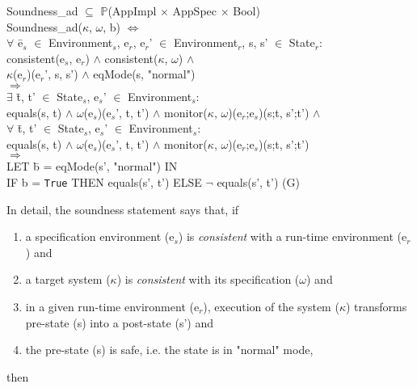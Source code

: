 \documentclass[conference]{IEEEtran}
\begin{document}
\begin{tabbing}
Soundness\_ad $\subseteq$ $\mathbb{P}$(AppImpl $\times$ AppSpec $\times$ Bool)
\\Soundness\_ad($\kappa$, $\omega$, b) $\Leftrightarrow$
\\$\forall$ \=e$_s$ $\in$ Environment$_s$, e$_r$, e$_r$' $\in$ Environment$_r$, s, s' $\in$ State$_r$:
\\\>consistent(e$_s$, e$_r$) $\wedge$ consistent($\kappa$, $\omega$) $\wedge$ 
\\\>\textlbrackdbl $\kappa$\textrbrackdbl(e$_r$)(e$_r$', s, s') $\wedge$ eqMode(s, "normal")
\\$\Rightarrow$
\\\>$\exists$ \=t, t' $\in$ State$_s$, e$_s$' $\in$ Environment$_s$: 
\\\>\>equals(s, t) $\wedge$ \textlbrackdbl $\omega$\textrbrackdbl(e$_s$)(e$_s$', t, t') $\wedge$ monitor($\kappa$, $\omega$)(e$_r$;e$_s$)(s;t, s';t')
$\wedge$
\\\>$\forall$ \=t, t' $\in$ State$_s$, e$_s$' $\in$ Environment$_s$: 
\\\>\>equals(s, t) $\wedge$ \textlbrackdbl $\omega$\textrbrackdbl(e$_s$)(e$_s$', t, t') $\wedge$ monitor($\kappa$, $\omega$)(e$_r$;e$_s$)(s;t, s';t')
\\\>$\Rightarrow$ \=
\\\> LET \=b = eqMode(s', "normal") IN
\\\>\>IF b = \texttt{True} THEN equals(s', t') ELSE $\neg$ equals(s', t')  \hspace*{0.2cm} (G)
\end{tabbing}

In detail, the soundness statement says that, if
\begin{enumerate}
\item a specification environment (e$_s$) is \emph{consistent} with a run-time environment (e$_r$) and
\item a target system ($\kappa$) is \emph{consistent} with its specification ($\omega$) and
\item in a given run-time environment (e$_r$), execution of the system ($\kappa$) transforms pre-state (s) into a post-state (s') and
\item the pre-state (s) is safe, i.e. the state is in "normal" mode,
\end{enumerate}
then 
\end{document}
